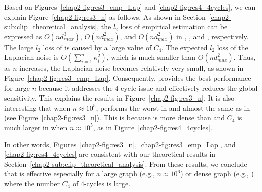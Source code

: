 Based on Figures~\ref{chap2-fig:res3_emp_Lap} and \ref{chap2-fig:res4_4cycles}, we can explain 
Figure~\ref{chap2-fig:res3_n} as follows. 
As shown in Section~\ref{chap2-sub:clip_theoretical_analysis}, the $l_2$ loss of empirical estimation can be expressed as 
$O(n d_{max}^3)$, $O(n d_{max}^2)$, and $O(n d_{max}^2)$ 
in \AlgOne{}, \AlgTwo{}, and \AlgThree{}, respectively. 
The large $l_2$ loss of \AlgOne{} is caused by a large value of $C_4$. 
The expected $l_2$ loss of the Laplacian noise is 
$O(\sum_{i=1}^n \kappa_i^2)$, 
which is much smaller than $O(n d_{max}^2)$. 
Thus, 
as $n$ increases, 
the Laplacian noise becomes relatively very small, 
as shown in Figure~\ref{chap2-fig:res3_emp_Lap}. 
Consequently, \AlgTwo{} provides the best performance for large $n$ because it addresses the $4$-cycle issue 
and effectively reduces the global sensitivity. 
This explains the results in Figure~\ref{chap2-fig:res3_n}. 
It is also interesting that when $n \approx 10^5$, \AlgOne{} performs the worst in \GPlus{} and almost the same as \AlgTwo{} in \IMDB{} (see Figure~\ref{chap2-fig:res3_n}). 
This is because \GPlus{} is more dense than \IMDB{} 
and $C_4$ is much larger in \GPlus{} when $n \approx 10^5$, as in Figure~\ref{chap2-fig:res4_4cycles}.

In other words, Figures~\ref{chap2-fig:res3_n}, \ref{chap2-fig:res3_emp_Lap}, and \ref{chap2-fig:res4_4cycles} are consistent with our theoretical results in Section~\ref{chap2-sub:clip_theoretical_analysis}. 
From these results, we conclude that \AlgTwo{} is effective especially for 
a large graph (e.g., $n \approx 10^6$) or dense graph (e.g., \GPlus{}) where the number $C_4$ of $4$-cycles is large. 



